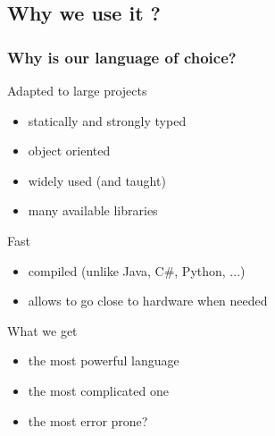 \subsection[Use]{Why we use it ?}

\begin{frame}
  \frametitle{Why is \cpp our language of choice?}
  \begin{block}{Adapted to large projects}
    \begin{itemize}
    \item statically and strongly typed
    \item object oriented
    \item widely used (and taught)
    \item many available libraries
    \end{itemize}
  \end{block}
  \pause
  \begin{block}{Fast}
    \begin{itemize}
    \item compiled (unlike Java, C\#, Python, ...)
    \item allows to go close to hardware when needed
    \end{itemize}
  \end{block}
  \pause
  \begin{alertblock}{What we get}
    \begin{itemize}
    \item the most powerful language
    \item the most complicated one
    \item the most error prone?
    \end{itemize}
  \end{alertblock}
\end{frame}
